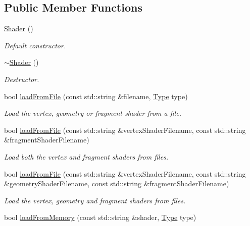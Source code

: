 \subsection*{Public Member Functions}
\begin{DoxyCompactItemize}
\item 
\hyperlink{classsf_1_1_shader_a1d7f28f26b4122959fcafec871c2c3c5}{Shader} ()
\begin{DoxyCompactList}\small\item\em Default constructor. \end{DoxyCompactList}\item 
\mbox{\label{classsf_1_1_shader_a4bac6cc8b046ecd8fb967c145a2380e6}} 
\hyperlink{classsf_1_1_shader_a4bac6cc8b046ecd8fb967c145a2380e6}{$\sim$\+Shader} ()
\begin{DoxyCompactList}\small\item\em Destructor. \end{DoxyCompactList}\item 
bool \hyperlink{classsf_1_1_shader_a053a5632848ebaca2fcd8ba29abe9e6e}{load\+From\+File} (const std\+::string \&filename, \hyperlink{classsf_1_1_shader_afaa1aa65e5de37b74d047da9def9f9b3}{Type} type)
\begin{DoxyCompactList}\small\item\em Load the vertex, geometry or fragment shader from a file. \end{DoxyCompactList}\item 
bool \hyperlink{classsf_1_1_shader_ac9d7289966fcef562eeb92271c03e3dc}{load\+From\+File} (const std\+::string \&vertex\+Shader\+Filename, const std\+::string \&fragment\+Shader\+Filename)
\begin{DoxyCompactList}\small\item\em Load both the vertex and fragment shaders from files. \end{DoxyCompactList}\item 
bool \hyperlink{classsf_1_1_shader_a295d8468811ca15bf9c5401a7a7d4f54}{load\+From\+File} (const std\+::string \&vertex\+Shader\+Filename, const std\+::string \&geometry\+Shader\+Filename, const std\+::string \&fragment\+Shader\+Filename)
\begin{DoxyCompactList}\small\item\em Load the vertex, geometry and fragment shaders from files. \end{DoxyCompactList}\item 
bool \hyperlink{classsf_1_1_shader_ac92d46bf71dff2d791117e4e472148aa}{load\+From\+Memory} (const std\+::string \&shader, \hyperlink{classsf_1_1_shader_afaa1aa65e5de37b74d047da9def9f9b3}{Type} type)

\end{DoxyCompactItemize}
